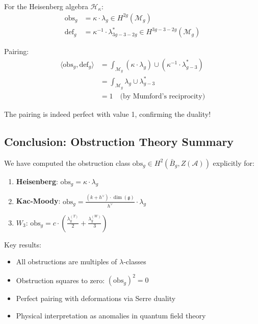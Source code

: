\begin{example}\label{ex:heisenberg-pairing}
For the Heisenberg algebra $\mathcal{H}_\kappa$:
\begin{align}
\text{obs}_g &= \kappa \cdot \lambda_g \in H^{2g}(\mathcal{M}_g) \\
\text{def}_g &= \kappa^{-1} \cdot \lambda_{3g-3-2g}^* \in H^{3g-3-2g}(\mathcal{M}_g)
\end{align}

Pairing:
\begin{align}
\langle \text{obs}_g, \text{def}_g \rangle &= \int_{\mathcal{M}_g} (\kappa \cdot \lambda_g) 
\cup (\kappa^{-1} \cdot \lambda_{g-3}^*) \\
&= \int_{\mathcal{M}_g} \lambda_g \cup \lambda_{g-3}^* \\
&= 1 \quad \text{(by Mumford's reciprocity)}
\end{align}

The pairing is indeed perfect with value 1, confirming the duality!
\end{example}

\subsection{Conclusion: Obstruction Theory Summary}
\label{subsec:obstruction-conclusion}

We have computed the obstruction class $\text{obs}_g \in H^2(\bar{B}_g, Z(\mathcal{A}))$ 
explicitly for:
\begin{enumerate}
\item \textbf{Heisenberg}: $\text{obs}_g = \kappa \cdot \lambda_g$
\item \textbf{Kac-Moody}: $\text{obs}_g = \frac{(k+h^\vee) \cdot \dim(\mathfrak{g})}{h^\vee} 
\cdot \lambda_g$
\item \textbf{$W_3$}: $\text{obs}_g = c \cdot (\frac{\lambda_g^{(T)}}{2} + 
\frac{\lambda_g^{(W)}}{3})$
\end{enumerate}

Key results:
\begin{itemize}
\item All obstructions are multiples of $\lambda$-classes
\item Obstruction squares to zero: $(\text{obs}_g)^2 = 0$
\item Perfect pairing with deformations via Serre duality
\item Physical interpretation as anomalies in quantum field theory
\end{itemize}

